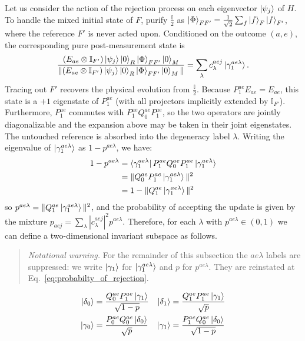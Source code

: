 \documentclass[aps,floatfix,10pt,amssymb,amsfont,amsmath,superscriptaddress,float,nofootinbib,longbibliography,nobalancelastpage,twocolumn]{revtex4-2}
\begin{document}
Let us consider the action of the rejection process on each eigenvector $\ket{\psi_j}$ of $H$. To handle the mixed initial state of $F$, purify $\frac{\mathbb{I}}{2}$ as $\ket{\Phi}_{FF'}=\frac{1}{\sqrt{2}}\sum_f\ket{f}_F\ket{f}_{F'}$, where the reference $F'$ is never acted upon. Conditioned on the outcome $(a,e)$, the corresponding pure post-measurement state is
\begin{equation}
    \frac{(E_{ae}\otimes\mathbb I_{F'})\ket{\psi_j}\ket{0}_R\ket{\Phi}_{FF'}\ket{0}_M}
    {\|(E_{ae}\otimes\mathbb I_{F'})\ket{\psi_j}\ket{0}_R\ket{\Phi}_{FF'}\ket{0}_M\|}
    = \sum_{\lambda} c_{\lambda}^{aej}\ket{\gamma_1^{ae \lambda}}.
\end{equation}
Tracing out $F'$ recovers the physical evolution from $\frac{\mathbb{I}}{2}$. Because $P_1^{ae}E_{ae}=E_{ae}$, this state is a $+1$ eigenstate of $P_1^{ae}$ (with all projectors implicitly extended by $\mathbb I_{F'}$). Furthermore, $P_1^{ae}$ commutes with $P^{ae}_1Q^{ae}_0P^{ae}_1$, so the two operators are jointly diagonalizable and the expansion above may be taken in their joint eigenstates. The untouched reference is absorbed into the degeneracy label $\lambda$.
Writing the eigenvalue of $\ket{\gamma^{ae\lambda}_1}$ as $1-p^{ae\lambda}$, we have: \begin{align}1-p^{ae\lambda}&=\bra{\gamma^{ae\lambda}_1}P^{ae}_1Q^{ae}_0P^{ae}_1\ket{\gamma^{ae\lambda}_1} \\&=\|Q^{ae}_0P^{ae}_1\ket{\gamma^{ae\lambda}_1}\|^2\\ &= 1-\|Q^{ae}_1\ket{\gamma^{ae\lambda}_1}\|^2
\end{align}
so $p^{ae\lambda} = \|Q^{ae}_1\ket{\gamma^{ae\lambda}_1}\|^2$, and the probability of accepting the update is given by the mixture $p_{aej} = \sum_{\lambda}|c^{aej}_{\lambda}|^2p^{ae\lambda}$. Therefore, for each $\lambda$ with $p^{ae\lambda} \in (0,1)$ we can define a two-dimensional invariant subspace as follows.
\begin{quote}
\emph{Notational warning.} For the remainder of this subsection the $ae\lambda$ labels are suppressed: we write $\ket{\gamma_1}$ for $\ket{\gamma^{ae\lambda}_1}$ and $p$ for $p^{ae\lambda}$. They are reinstated at Eq.~\eqref{eq:probabilty_of_rejection}.
\end{quote}
\begin{align}
    \ket{\delta_0} &= \frac{Q^{ae}_0P^{ae}_1\ket{\gamma_1}}{\sqrt{1-p}} &\ket{\delta_1} &= \frac{Q^{ae}_1P^{ae}_1\ket{\gamma_1}}{\sqrt{p}} \\
    \ket{\gamma_0} &= \frac{P^{ae}_0Q^{ae}_0\ket{\delta_0}}{\sqrt{p}} &\ket{\gamma_1} &= \frac{P^{ae}_1Q^{ae}_0\ket{\delta_0}}{\sqrt{1-p}}
\end{align}
\end{document}
